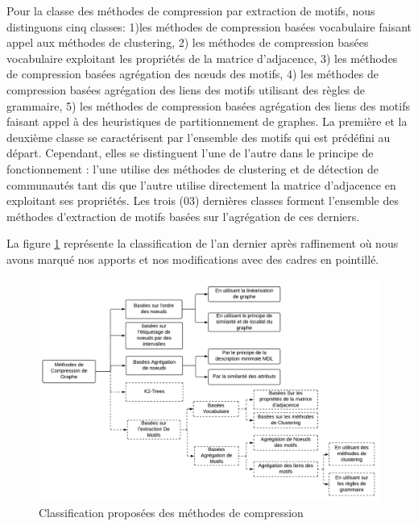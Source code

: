 Pour la classe des méthodes de compression par extraction de motifs, nous distinguons cinq classes: 1)les méthodes de compression basées vocabulaire faisant appel aux méthodes de clustering, 2) les méthodes de compression basées vocabulaire exploitant les propriétés de la matrice d'adjacence, 3) les méthodes de compression basées agrégation des nœuds des motifs, 4) les méthodes de compression basées agrégation des liens des motifs utilisant des règles de grammaire, 5) les méthodes de compression basées agrégation des liens des motifs faisant appel à des heuristiques de partitionnement de graphes. La première et la deuxième classe se caractérisent par l'ensemble des motifs qui est prédéfini au départ. Cependant, elles se distinguent l'une de l'autre dans le principe de fonctionnement : l'une utilise des méthodes de clustering et de détection de communautés tant dis que l'autre utilise directement la matrice d'adjacence en exploitant ses propriétés. Les trois (03) dernières classes forment l'ensemble des méthodes d'extraction de motifs basées sur l'agrégation de ces derniers. 



 La figure \ref{classif} représente la classification de l'an dernier après raffinement où nous avons marqué nos apports et nos modifications avec des cadres en pointillé.

 \begin{figure}[H]
		\includegraphics[scale=0.55]{./ressources/image/Classification.png}
		\caption{Classification proposées des méthodes de compression}
		\label{classif}
	\end{figure}





